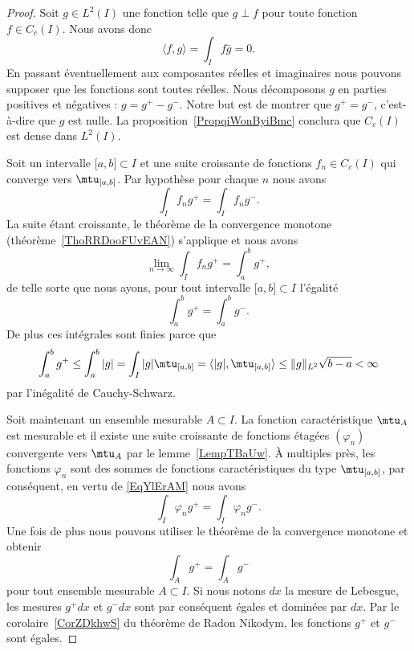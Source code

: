 \begin{proof}
	Soit \( g\in L^2(I)\) une fonction telle que \( g\perp f\) pour toute fonction \( f\in C_c(I)\). Nous avons donc
	\begin{equation}
		\langle f, g\rangle =\int_If\bar g=0.
	\end{equation}
	En passant éventuellement aux composantes réelles et imaginaires nous pouvons supposer que les fonctions sont toutes réelles. Nous décomposons \( g\) en parties positives et négatives : \( g=g^+-g^-\). Notre but est de montrer que \( g^+=g^-\), c'est-à-dire que \( g\) est nulle. La proposition~\ref{PropqiWonByiBmc} conclura que \( C_c(I)\) est dense dans \( L^2(I)\).

	Soit un intervalle \( \mathopen[ a , b \mathclose]\subset I\) et une suite croissante de fonctions \( f_n\in C_c(I)\) qui converge vers \( \mtu_{\mathopen[ a , b \mathclose]}\). Par hypothèse pour chaque \( n\) nous avons
	\begin{equation}
		\int_If_ng^+=\int_I f_ng^-.
	\end{equation}
	La suite étant croissante, le théorème de la convergence monotone (théorème~\ref{ThoRRDooFUvEAN}) s'applique et nous avons
	\begin{equation}
		\lim_{n\to \infty} \int_I f_ng^+=\int_a^bg^+,
	\end{equation}
	de telle sorte que nous ayons, pour tout intervalle \( \mathopen[ a , b \mathclose]\subset I\) l'égalité
	\begin{equation}        \label{EqYlErAM}
		\int_a^bg^+=\int_a^bg^-.
	\end{equation}
	De plus ces intégrales sont finies parce que
	\begin{equation}
		\int_a^b g^+\leq\int_a^b| g |=\int_I| g |\mtu_{\mathopen[ a , b \mathclose]}=\langle | g |, \mtu_{\mathopen[ a , b \mathclose]}\rangle \leq \| g \|_{L^2}\sqrt{b-a}<\infty
	\end{equation}
	par l'inégalité de Cauchy-Schwarz.

	Soit maintenant un ensemble mesurable \( A\subset I\). La fonction caractéristique \( \mtu_A\) est mesurable et il existe une suite croissante de fonctions étagées \( (\varphi_n)\) convergente vers \( \mtu_A\) par le lemme~\ref{LempTBaUw}. À multiples près, les fonctions \( \varphi_n\) sont des sommes de fonctions caractéristiques du type \( \mtu_{\mathopen[ a , b \mathclose]}\), par conséquent, en vertu de \eqref{EqYlErAM} nous avons
	\begin{equation}
		\int_I\varphi_ng^+=\int_I\varphi_ng^-.
	\end{equation}
	Une fois de plus nous pouvons utiliser le théorème de la convergence monotone et obtenir
	\begin{equation}
		\int_Ag^+=\int_A g^-
	\end{equation}
	pour tout ensemble mesurable \( A\subset I\). Si nous notons \( dx\) la mesure de Lebesgue, les mesures \( g^+dx\) et \( g^-dx\) sont par conséquent égales et dominées par \( dx\). Par le corolaire~\ref{CorZDkhwS} du théorème de Radon Nikodym, les fonctions \( g^+\) et \( g^-\) sont égales.
\end{proof}


